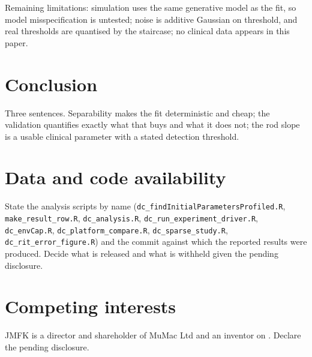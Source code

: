 \documentclass[11pt,a4paper]{article}
\begin{document}
\begin{towrite}
Remaining limitations: simulation uses the same generative model as the fit,
so model misspecification is untested; noise is additive Gaussian on
threshold, and real thresholds are quantised by the staircase; no clinical
data appears in this paper.
\end{towrite}

\section{Conclusion}
\begin{towrite}
Three sentences. Separability makes the fit deterministic and cheap; the
validation quantifies exactly what that buys and what it does not; the rod
slope is a usable clinical parameter with a stated detection threshold.
\end{towrite}

\section*{Data and code availability}
\begin{towrite}
State the analysis scripts by name (\texttt{dc\_findInitialParametersProfiled.R},
\texttt{make\_result\_row.R}, \texttt{dc\_analysis.R},
\texttt{dc\_run\_experiment\_driver.R}, \texttt{dc\_envCap.R},
\texttt{dc\_platform\_compare.R}, \texttt{dc\_sparse\_study.R},
\texttt{dc\_rit\_error\_figure.R}) and the commit against which the reported
results were produced. Decide what is released and what is withheld given
the pending disclosure.
\end{towrite}

\section*{Competing interests}
\begin{towrite}
JMFK is a director and shareholder of MuMac Ltd and an inventor on
\citet{Kelly:2020aa}. Declare the pending disclosure.
\end{towrite}


\end{document}
